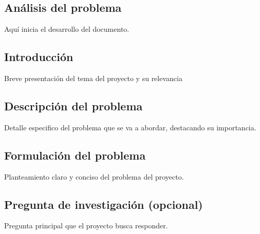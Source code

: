 \documentclass[12pt,letterpaper]{report}
\begin{document}
	\iniciarNumeracion
	\renewcommand{\thesection}{\arabic{section}}
	\begin{center}
	\section{Análisis del problema}
	\end{center}
	
	Aquí inicia el desarrollo del documento.
	\subsection{Introducción}
	Breve presentación del tema del proyecto y su relevancia
	\subsection{Descripción del problema}
	Detalle especifico del problema que se va a abordar, destacando su importancia.
	\subsection{Formulación del problema}
	Planteamiento claro y conciso del problema del proyecto.
	\subsection{Pregunta de investigación (opcional)}
	Pregunta principal que el proyecto busca responder.
\end{document}
